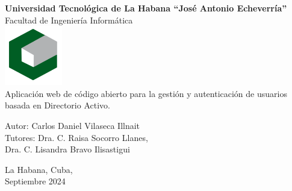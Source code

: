 
\begin{titlepage}
    \centering
    {\fontsize{26pt}{30pt}\selectfont\bfseries Universidad Tecnológica de La Habana “José Antonio Echeverría”}\\
    \vspace{1cm}
    {\fontsize{15pt}{18pt}\selectfont Facultad de Ingeniería Informática}\\
    \vspace{1cm}
    \includegraphics{images/cujae.png}\\
    \vspace{1cm}
    {\fontsize{12pt}{14pt}\selectfont Aplicación web de código abierto para la gestión y autenticación de usuarios basada en Directorio Activo.}\\
    \vspace{2cm}
    \begin{flushleft}
        Autor: Carlos Daniel Vilaseca Illnait\\
        Tutores: Dra. C. Raisa Socorro Llanes,\\ Dra. C. Lisandra Bravo Ilisastigui
    \end{flushleft}
    \vfill
    La Habana, Cuba,\\ Septiembre 2024
\end{titlepage}
